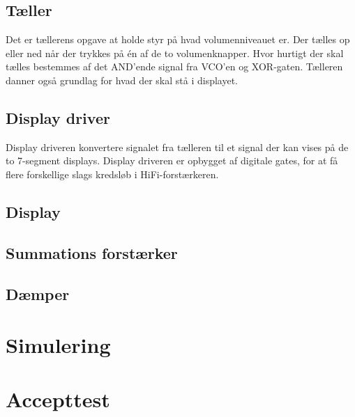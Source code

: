 \subsection{Tæller}
\label{volumenkontrol-simulering-taeller}

Det er tællerens opgave at holde styr på hvad volumenniveauet er. Der tælles op eller ned når der trykkes på én af de to volumenknapper. Hvor hurtigt der skal tælles bestemmes af det AND'ende signal fra VCO'en og XOR-gaten. Tælleren danner også grundlag for hvad der skal stå i displayet.

\subsection{Display driver}
\label{volumenkontrol-simulering-display_driver}

Display driveren konvertere signalet fra tælleren til et signal der kan vises på de to 7-segment displays. Display driveren er opbygget af digitale gates, for at få flere forskellige slags kredsløb i HiFi-forstærkeren.

\subsection{Display}
\label{volumenkontrol-simulering-display}



\subsection{Summations forstærker}
\label{volumenkontrol-simulering-summations_forstaerker}



\subsection{Dæmper}
\label{volumenkontrol-simulering-daemper}


\section{Simulering}
\label{volumenkontrol-simulering}

\section{Accepttest}
\label{volumenkontrol-accepttest}


